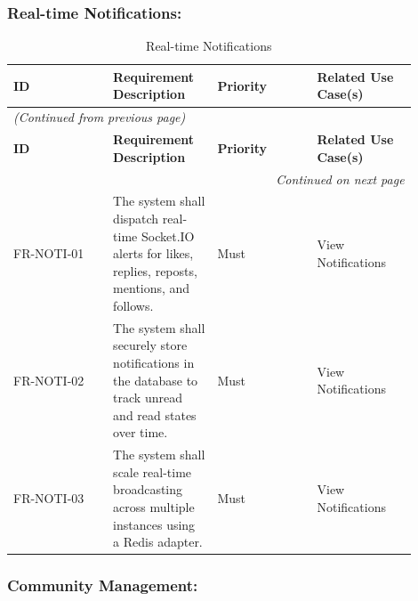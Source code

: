\subsubsection{Real-time Notifications:}

\begin{longtable}{|p{0.225\linewidth}|p{0.225\linewidth}|p{0.225\linewidth}|p{0.225\linewidth}|}
\caption{Real-time Notifications} \label{tab:12} \\
\hline
\textbf{ID} & \textbf{Requirement Description} & \textbf{Priority} & \textbf{Related Use Case(s)} \\
\hline
\endfirsthead
\multicolumn{4}{l}{\textit{(Continued from previous page)}} \\
\hline
\textbf{ID} & \textbf{Requirement Description} & \textbf{Priority} & \textbf{Related Use Case(s)} \\
\hline
\endhead
\hline \multicolumn{4}{r}{\textit{Continued on next page}} \\
\endfoot
\hline
\endlastfoot
FR-NOTI-01 & The system shall dispatch real-time Socket.IO alerts for likes, replies, reposts, mentions, and follows. & Must & View Notifications \\
\hline
FR-NOTI-02 & The system shall securely store notifications in the database to track unread and read states over time. & Must & View Notifications \\
\hline
FR-NOTI-03 & The system shall scale real-time broadcasting across multiple instances using a Redis adapter. & Must & View Notifications \\
\hline
\end{longtable}


\subsubsection{Community Management:}

